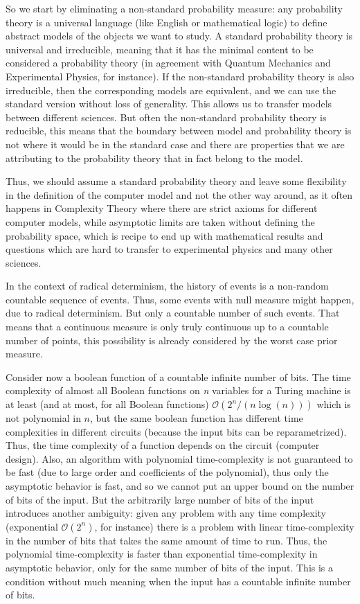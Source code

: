 \documentclass[11pt]{book}
\begin{document}
So we start by eliminating a non-standard probability measure: any
probability theory is a universal language (like English or mathematical
logic) to define abstract models of the objects we want to study. A
standard probability theory is universal and irreducible, meaning that
it has the minimal content to be considered a probability theory (in
agreement with Quantum Mechanics and Experimental Physics, for
instance). If the non-standard probability theory is also irreducible,
then the corresponding models are equivalent, and we can use the
standard version without loss of generality. This allows us to transfer
models between different sciences. But often the non-standard
probability theory is reducible, this means that the boundary between
model and probability theory is not where it would be in the standard
case and there are properties that we are attributing to the probability
theory that in fact belong to the model.

Thus, we should assume a standard probability theory and leave some
flexibility in the definition of the computer model and not the other
way around, as it often happens in Complexity Theory where there are
strict axioms for different computer models, while asymptotic limits are
taken without defining the probability space, which is recipe to end up
with mathematical results and questions which are hard to transfer to
experimental physics and many other sciences.

In the context of radical determinism, the history of events is a
non-random countable sequence of events. Thus, some events with null
measure might happen, due to radical determinism. But only a countable
number of such events. That means that a continuous measure is only
truly continuous up to a countable number of points, this possibility is
already considered by the worst case prior measure.

Consider now a boolean function of a countable infinite number of bits.
The time complexity of almost all Boolean functions on \emph{n}
variables for a Turing machine is at least (and at most, for all Boolean
functions)
\(\mathcal{O}(2^n/(n\log(n)))\)\cite{shannon1949synthesis} \cite{10.1145ux2f322123.322138} which is not polynomial in \(n\), but the same boolean
function has different time complexities in different
circuits\cite{shannon1949synthesis}
(because the input bits can be reparametrized). Thus, the time
complexity of a function depends on the circuit (computer design). Also,
an algorithm with polynomial time-complexity is not guaranteed to be
fast (due to large order and coefficients of the polynomial), thus only
the asymptotic behavior is fast, and so we cannot put an upper bound on
the number of bits of the input. But the arbitrarily large number of
bits of the input introduces another ambiguity: given any problem with
any time complexity (exponential \(\mathcal{O}(2^n)\), for instance)
there is a problem with linear time-complexity in the number of bits
that takes the same amount of time to run. Thus, the polynomial
time-complexity is faster than exponential time-complexity in asymptotic
behavior, only for the same number of bits of the input. This is a
condition without much meaning when the input has a countable infinite
number of bits.
\end{document}
